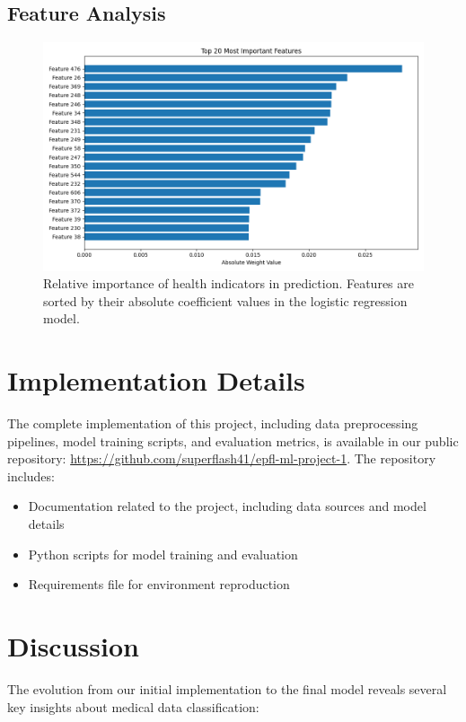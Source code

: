 \documentclass[10pt,conference,compsocconf]{IEEEtran}
\begin{document}
\subsection{Feature Analysis}
\begin{figure}[H]
    \centering
    \includegraphics[width=0.95\columnwidth]{figures/feature_importance.png}
    \caption{Relative importance of health indicators in prediction. 
    Features are sorted by their absolute coefficient values in the logistic regression model.}
    \label{fig:features}
\end{figure}

\section{Implementation Details}
The complete implementation of this project, including data preprocessing pipelines,
model training scripts, and evaluation metrics, is available in our public repository:
\url{https://github.com/superflash41/epfl-ml-project-1}. The repository includes:

\begin{itemize}
    \item Documentation related to the project, including data sources and model details
    \item Python scripts for model training and evaluation
    \item Requirements file for environment reproduction
\end{itemize}


\section{Discussion}

The evolution from our initial implementation to the final model reveals several key
insights about medical data classification:
\end{document}
